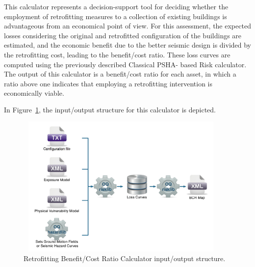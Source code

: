 This calculator represents a decision-support tool for deciding whether the
employment of retrofitting measures to a collection of existing buildings is
advantageous from an economical point of view. For this assessment, the
expected losses considering the original and retrofitted configuration of the
buildings are estimated, and the economic benefit due to the better seismic
design is divided by the retrofitting cost, leading to the benefit/cost ratio.
These loss curves are computed using the previously described  Classical PSHA-
based Risk calculator. The output of this calculator is a benefit/cost ratio
for each asset, in which a ratio above one indicates that employing  a
retrofitting intervention is economically viable.

In Figure~\ref{fig:io-structure-benefit-cost}, the input/output structure for
this calculator is depicted.

\begin{figure}[ht]
\centering
\includegraphics[width=10.5cm,height=7cm]{figures/risk/io-structure-benefit-cost.pdf}
\caption{Retrofitting Benefit/Cost Ratio Calculator input/output structure.}
\label{fig:io-structure-benefit-cost}
\end{figure}